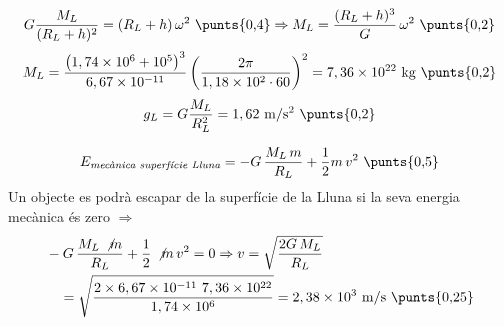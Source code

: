 \begin{solapartat}
\[ G\frac{M_L}{(R_L+h)^2} = (R_L+h)\,\omega^2 \ \text{\punts{0,4}} \Rightarrow M_L = \frac{(R_L+h)^3}{G}\,\omega^2 \ \text{\punts{0,2}} \]
\[ M_L = \frac{\left(1,74\times 10^{6} + 10^{5}\right)^3}{6,67\times 10^{-11}}\left(\frac{2\pi}{1,18\times 10^{2}\cdot 60}\right)^2 = 7,36\times 10^{22}\ \mathrm{kg} \ \text{\punts{0,2}} \]
\[ g_L = G\frac{M_L}{R_L^2} = 1,62\ \mathrm{m/s^2} \ \text{\punts{0,2}} \]
\end{solapartat}

\begin{solapartat}
\[ E_{\textit{mecànica superfície Lluna}} = -G\,\frac{M_L\,m}{R_L} + \frac{1}{2}m\,v^2 \ \text{\punts{0,5}} \]
Un objecte es podrà escapar de la superfície de la Lluna si la seva energia mecànica és zero  $\Rightarrow$
\begin{align*}
&-G\,\frac{M_L\,\not{m}}{R_L} + \frac{1}{2}\,\not{m}\,v^2 = 0 \Rightarrow v = \sqrt{\frac{2G\,M_L}{R_L}}\\
&\quad = \sqrt{\frac{2\times 6,67\times 10^{-11}\ 7,36\times 10^{22}}{1,74\times 10^{6}}} = 2,38\times 10^{3}\ \mathrm{m/s} \ \text{\punts{0,25}}
\end{align*}
\end{solapartat}
